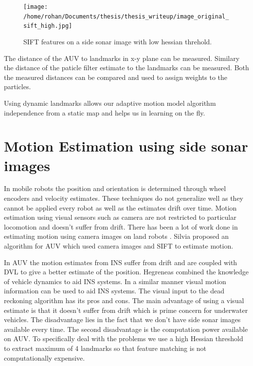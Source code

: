 \documentclass[12pt,draft]{dalcsthesis}
\begin{document}
\begin{figure}
  \centering
     {\texttt{[image: /home/rohan/Documents/thesis/thesis\_writeup/image\_original\_sift\_high.jpg]}}
  \caption{\label{fig- side sonar sift high} SIFT features on a side sonar image with low hessian threhold.}
\end{figure}


The distance of the AUV to landmarks in x-y plane can be measured. Similary the distance of the paticle filter estimate to the landmarks can be measured. Both the measured distances can be compared and used to assign weights to the particles. 

Using dynamic landmarks allows our adaptive motion model algorithm independence from a static map and helps us in learning on the fly.  

\section{Motion Estimation using side sonar images}

In mobile robots the position and orientation is determined through wheel encoders and velocity estimates. These techniques do not generalize well as they cannot be applied every robot as well as the estimates drift over time. Motion estimation using visual sensors such as camera are not restricted to particular locomotion and doesn't suffer from drift. There has been a lot of work done in estimating motion using camera images on land robots \cite{barfoot2005online} \cite{scaramuzza2008appearance}. Silvia \cite{Silva} proposed an algorithm for AUV which used camera images and SIFT to estimate motion. 

In AUV the motion estimates from INS suffer from drift and are coupled with DVL to give a better estimate of the position. Hegreneas \cite{hegrenaes2008model} combined the knowledge of vehicle dynamics to aid INS systems. In a similar manner visual motion information can be used to aid INS systems. The visual input to the dead reckoning algorithm has its pros and cons. The main advantage of using a visual estimate is that it doesn't suffer from drift which is prime concern for underwater vehicles. The disadvantage lies in the fact that we don't have side sonar images available every time. The second disadvantage is the computation power available on AUV. To specifically deal with the problems we use a high Hessian threshold to extract maximum of 4 landmarks so that feature matching is not computationally expensive.    
\end{document}
